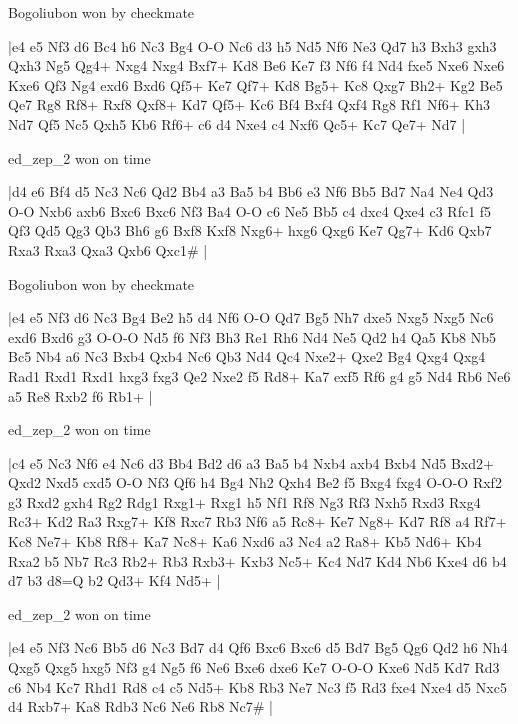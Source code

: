 \showboard

Bogoliubon won by checkmate

\makegametitle
|e4 e5 Nf3 d6 Bc4 h6 Nc3 Bg4 O-O Nc6 d3 h5 Nd5 Nf6 Ne3 Qd7 h3 Bxh3 gxh3 Qxh3 Ng5 Qg4+ Nxg4 Nxg4 Bxf7+ Kd8 Be6 Ke7 f3 Nf6 f4 Nd4 fxe5 Nxe6 Nxe6 Kxe6 Qf3 Ng4 exd6 Bxd6 Qf5+ Ke7 Qf7+ Kd8 Bg5+ Kc8 Qxg7 Bh2+ Kg2 Be5 Qe7 Rg8 Rf8+ Rxf8 Qxf8+ Kd7 Qf5+ Kc6 Bf4 Bxf4 Qxf4 Rg8 Rf1 Nf6+ Kh3 Nd7 Qf5 Nc5 Qxh5 Kb6 Rf6+ c6 d4 Nxe4 c4 Nxf6 Qc5+ Kc7 Qe7+ Nd7  |

\showboard

ed\_zep\_2 won on time

\makegametitle
|d4 e6 Bf4 d5 Nc3 Nc6 Qd2 Bb4 a3 Ba5 b4 Bb6 e3 Nf6 Bb5 Bd7 Na4 Ne4 Qd3 O-O Nxb6 axb6 Bxc6 Bxc6 Nf3 Ba4 O-O c6 Ne5 Bb5 c4 dxc4 Qxe4 c3 Rfc1 f5 Qf3 Qd5 Qg3 Qb3 Bh6 g6 Bxf8 Kxf8 Nxg6+ hxg6 Qxg6 Ke7 Qg7+ Kd6 Qxb7 Rxa3 Rxa3 Qxa3 Qxb6 Qxc1\#  |

\showboard

Bogoliubon won by checkmate

\makegametitle
|e4 e5 Nf3 d6 Nc3 Bg4 Be2 h5 d4 Nf6 O-O Qd7 Bg5 Nh7 dxe5 Nxg5 Nxg5 Nc6 exd6 Bxd6 g3 O-O-O Nd5 f6 Nf3 Bh3 Re1 Rh6 Nd4 Ne5 Qd2 h4 Qa5 Kb8 Nb5 Bc5 Nb4 a6 Nc3 Bxb4 Qxb4 Nc6 Qb3 Nd4 Qc4 Nxe2+ Qxe2 Bg4 Qxg4 Qxg4 Rad1 Rxd1 Rxd1 hxg3 fxg3 Qe2 Nxe2 f5 Rd8+ Ka7 exf5 Rf6 g4 g5 Nd4 Rb6 Ne6 a5 Re8 Rxb2 f6 Rb1+  |

\showboard

ed\_zep\_2 won on time

\makegametitle
|c4 e5 Nc3 Nf6 e4 Nc6 d3 Bb4 Bd2 d6 a3 Ba5 b4 Nxb4 axb4 Bxb4 Nd5 Bxd2+ Qxd2 Nxd5 cxd5 O-O Nf3 Qf6 h4 Bg4 Nh2 Qxh4 Be2 f5 Bxg4 fxg4 O-O-O Rxf2 g3 Rxd2 gxh4 Rg2 Rdg1 Rxg1+ Rxg1 h5 Nf1 Rf8 Ng3 Rf3 Nxh5 Rxd3 Rxg4 Rc3+ Kd2 Ra3 Rxg7+ Kf8 Rxc7 Rb3 Nf6 a5 Rc8+ Ke7 Ng8+ Kd7 Rf8 a4 Rf7+ Kc8 Ne7+ Kb8 Rf8+ Ka7 Nc8+ Ka6 Nxd6 a3 Nc4 a2 Ra8+ Kb5 Nd6+ Kb4 Rxa2 b5 Nb7 Rc3 Rb2+ Rb3 Rxb3+ Kxb3 Nc5+ Kc4 Nd7 Kd4 Nb6 Kxe4 d6 b4 d7 b3 d8=Q b2 Qd3+ Kf4 Nd5+  |

\showboard

ed\_zep\_2 won on time

\makegametitle
|e4 e5 Nf3 Nc6 Bb5 d6 Nc3 Bd7 d4 Qf6 Bxc6 Bxc6 d5 Bd7 Bg5 Qg6 Qd2 h6 Nh4 Qxg5 Qxg5 hxg5 Nf3 g4 Ng5 f6 Ne6 Bxe6 dxe6 Ke7 O-O-O Kxe6 Nd5 Kd7 Rd3 c6 Nb4 Kc7 Rhd1 Rd8 c4 c5 Nd5+ Kb8 Rb3 Ne7 Nc3 f5 Rd3 fxe4 Nxe4 d5 Nxc5 d4 Rxb7+ Ka8 Rdb3 Nc6 Ne6 Rb8 Nc7\#  |

